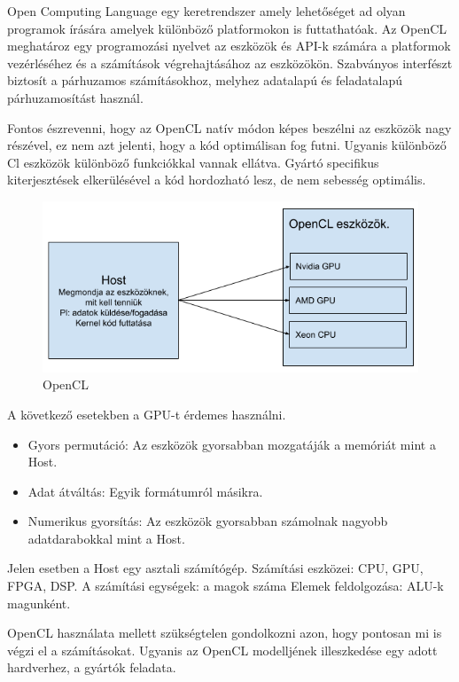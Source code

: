 

Open Computing Language egy keretrendszer amely lehetőséget ad olyan programok írására amelyek különböző platformokon is futtathatóak.
Az OpenCL meghatároz egy programozási nyelvet az eszközök és API-k számára a platformok vezérléséhez és a számítások végrehajtásához az eszközökön. Szabványos interfészt biztosít a párhuzamos számításokhoz, melyhez adatalapú és feladatalapú párhuzamosítást használ.

Fontos észrevenni, hogy az OpenCL natív módon képes beszélni az eszközök nagy részével, ez nem azt jelenti, hogy a kód optimálisan fog futni. Ugyanis különböző Cl eszközök különböző funkciókkal vannak ellátva. Gyártó specifikus kiterjesztések elkerülésével a kód hordozható lesz, de nem sebesség optimális.

\begin{figure}[h!]
\centering
\includegraphics[width=\textwidth]{images/opencl.png}
\caption{OpenCL}
\label{fig:opencl}
\end{figure}

A következő esetekben a GPU-t érdemes használni.
\begin{itemize}
\item Gyors permutáció: Az eszközök gyorsabban mozgatáják a memóriát mint a Host.
\item Adat átváltás: Egyik formátumról másikra.
\item Numerikus gyorsítás: Az eszközök gyorsabban számolnak nagyobb adatdarabokkal mint a Host.
\end{itemize}
Jelen esetben a Host egy asztali számítógép.
Számítási eszközei: CPU, GPU, FPGA, DSP.
A számítási egységek: a magok száma
Elemek feldolgozása: ALU-k magunként.

OpenCL használata mellett szükségtelen gondolkozni azon, hogy pontosan mi is végzi el a számításokat. Ugyanis az OpenCL modelljének illeszkedése egy adott hardverhez, a gyártók feladata.
